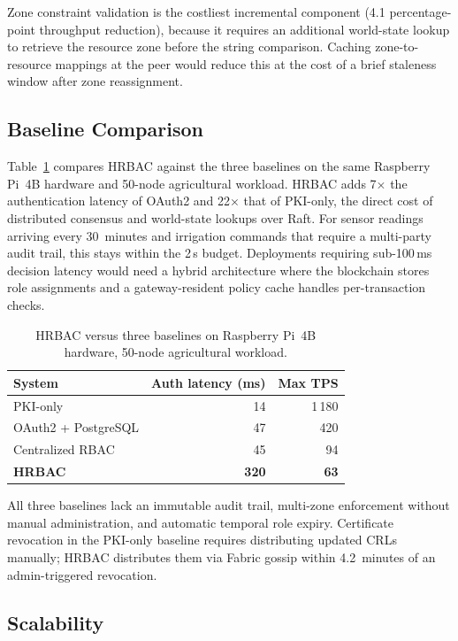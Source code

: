 \documentclass[a4paper,fleqn]{cas-dc}
\begin{document}
Zone constraint validation is the costliest incremental component (4.1
percentage-point throughput reduction), because it requires an
additional world-state lookup to retrieve the resource zone before the
string comparison. Caching zone-to-resource mappings at the peer would
reduce this at the cost of a brief staleness window after zone
reassignment.

\subsection{Baseline Comparison}
\label{subsec:baselines}

Table~\ref{tab:baselines} compares HRBAC against the three baselines
on the same Raspberry Pi~4B hardware and 50-node agricultural workload. HRBAC adds 7$\times$ the authentication latency
of OAuth2 and 22$\times$ that of PKI-only, the direct cost of
distributed consensus and world-state lookups over Raft. For sensor
readings arriving every 30~minutes and irrigation commands that require
a multi-party audit trail, this stays within the 2\,s budget.
Deployments requiring sub-100\,ms decision latency would need a
hybrid architecture where the blockchain stores role assignments and a
gateway-resident policy cache handles per-transaction checks.

\begin{table}[pos=t]
\caption{HRBAC versus three baselines on Raspberry Pi~4B hardware,
  50-node agricultural workload.}
\label{tab:baselines}
\begin{tabularx}{\tblwidth}{@{}Xrr@{}}
\toprule
System & Auth latency (ms) & Max TPS \\
\midrule
PKI-only          & 14   & 1\,180 \\
OAuth2 + PostgreSQL & 47 & 420 \\
Centralized RBAC  & 45   & 94 \\
\textbf{HRBAC}    & \textbf{320} & \textbf{63} \\
\bottomrule
\end{tabularx}
\end{table}

All three baselines lack an immutable audit trail, multi-zone
enforcement without manual administration, and automatic temporal role
expiry. Certificate revocation in the PKI-only baseline requires
distributing updated CRLs manually; HRBAC distributes them via Fabric
gossip within 4.2~minutes of an admin-triggered revocation.

\subsection{Scalability}
\label{subsec:scale}
\end{document}
